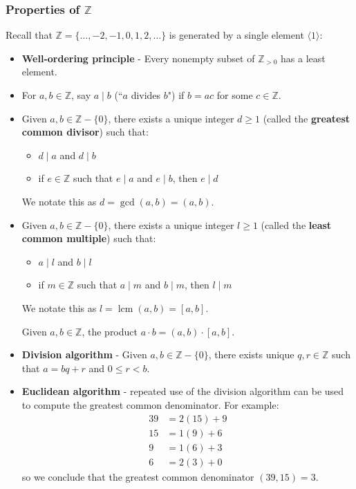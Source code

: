 \documentclass{article}
\theoremstyle{plain}
\newcommand{\Z}{\mathbb{Z}}
\begin{document}
\subsubsection{Properties of $\Z$}
Recall that $\Z = \{\ldots,-2,-1,0,1,2,\ldots\}$ is generated by a single element $\langle 1 \rangle$:
\begin{itemize}
\item \textbf{Well-ordering principle} - Every nonempty subset of $\Z_{> 0}$ has a least element. 
\item For $a,b \in \Z$, say $a\mid b$ (``$a$ divides $b$") if $b=ac$ for some $c \in \Z$.
\item Given $a,b \in \Z - \{0\}$, there exists a unique integer $d \ge 1$ (called the \textbf{greatest common divisor}) such that:
	\begin{itemize}
	\item $d\mid a$ and $d\mid b$
	\item if $e\in\Z$ such that $e\mid a$ and $e\mid b$, then $e\mid d$
	\end{itemize}
We notate this as $d=\operatorname{gcd}(a,b) = (a,b)$.
\item Given $a,b \in \Z - \{ 0 \}$, there exists a unique integer $l \ge 1$ (called the \textbf{least common multiple}) such that:
	\begin{itemize}
	\item $a\mid l$ and $b\mid l$
	\item if $m\in\Z$ such that $a\mid m$ and $b\mid m$, then $l\mid m$
	\end{itemize}
We notate this as $l=\operatorname{lcm}(a,b) = [a,b]$.
\begin{theorem}{}{}
Given $a,b \in \Z$, the product $a\cdot b = (a,b)\cdot [a,b]$.
\end{theorem}
\item \textbf{Division algorithm} - Given $a,b\in\Z-\{0\}$, there exists unique $q,r\in\Z$ such that $a=bq+r$ and $0 \le r < b$.
\item \textbf{Euclidean algorithm} - repeated use of the division algorithm can be used to compute the greatest common denominator. For example:
\begin{align*}
39 &= 2(15) + 9 \\
15 &= 1(9) + 6 \\
9 &= 1(6) + 3 \\
6 &= 2(3) + 0
\end{align*}
so we conclude that the greatest common denominator $(39,15) = 3$.
\begin{theorem}{}{}

\end{theorem}
\end{itemize}
\end{document}
